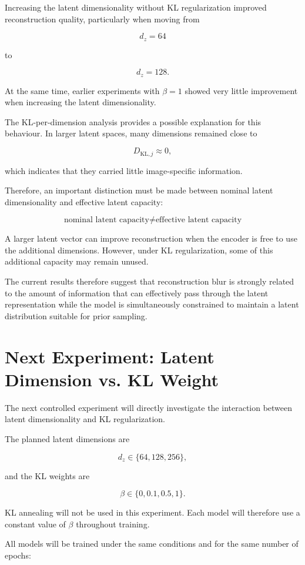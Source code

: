 \documentclass[a4paper,11pt]{article}
\begin{document}
Increasing the latent dimensionality without KL regularization improved reconstruction quality, particularly when moving from

\[
d_z = 64
\]

to

\[
d_z = 128.
\]

At the same time, earlier experiments with $\beta=1$ showed very little improvement when increasing the latent dimensionality.

The KL-per-dimension analysis provides a possible explanation for this behaviour. In larger latent spaces, many dimensions remained close to

\[
D_{\mathrm{KL},j} \approx 0,
\]

which indicates that they carried little image-specific information.

Therefore, an important distinction must be made between nominal latent dimensionality and effective latent capacity:

\[
\boxed{
\text{nominal latent capacity}
\neq
\text{effective latent capacity}
}
\]

A larger latent vector can improve reconstruction when the encoder is free to use the additional dimensions. However, under KL regularization, some of this additional capacity may remain unused.

The current results therefore suggest that reconstruction blur is strongly related to the amount of information that can effectively pass through the latent representation while the model is simultaneously constrained to maintain a latent distribution suitable for prior sampling.

\section{Next Experiment: Latent Dimension vs. KL Weight}

The next controlled experiment will directly investigate the interaction between latent dimensionality and KL regularization.

The planned latent dimensions are

\[
d_z \in \{64,128,256\},
\]

and the KL weights are

\[
\beta \in \{0,0.1,0.5,1\}.
\]

KL annealing will not be used in this experiment. Each model will therefore use a constant value of $\beta$ throughout training.

All models will be trained under the same conditions and for the same number of epochs:
\end{document}
